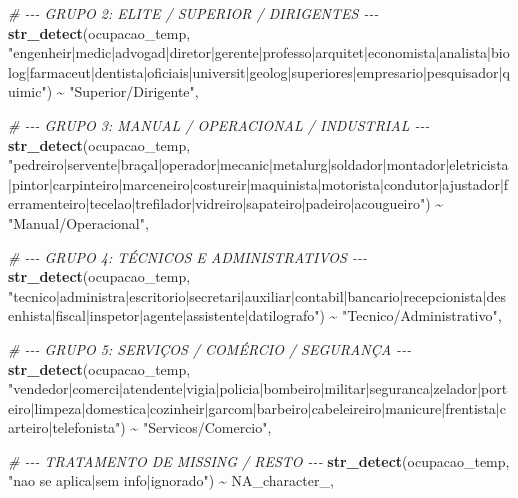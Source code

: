 \documentclass[
]{article}
\newenvironment{Shaded}{\begin{snugshade}}{\end{snugshade}}
\newcommand{\CommentTok}[1]{\textcolor[rgb]{0.56,0.35,0.01}{\textit{#1}}}
\newcommand{\ConstantTok}[1]{\textcolor[rgb]{0.56,0.35,0.01}{#1}}
\newcommand{\FunctionTok}[1]{\textcolor[rgb]{0.13,0.29,0.53}{\textbf{#1}}}
\newcommand{\NormalTok}[1]{#1}
\newcommand{\SpecialCharTok}[1]{\textcolor[rgb]{0.81,0.36,0.00}{\textbf{#1}}}
\newcommand{\StringTok}[1]{\textcolor[rgb]{0.31,0.60,0.02}{#1}}
\begin{document}
\begin{Shaded}
\begin{Highlighting}[]
      \CommentTok{\# {-}{-}{-} GRUPO 2: ELITE / SUPERIOR / DIRIGENTES {-}{-}{-}}
      \FunctionTok{str\_detect}\NormalTok{(ocupacao\_temp, }\StringTok{"engenheir|medic|advogad|diretor|gerente|professo|arquitet|economista|analista|biolog|farmaceut|dentista|oficiais|universit|geolog|superiores|empresario|pesquisador|quimic"}\NormalTok{) }\SpecialCharTok{\textasciitilde{}} \StringTok{"Superior/Dirigente"}\NormalTok{,}
      
      \CommentTok{\# {-}{-}{-} GRUPO 3: MANUAL / OPERACIONAL / INDUSTRIAL {-}{-}{-}}
      \FunctionTok{str\_detect}\NormalTok{(ocupacao\_temp, }\StringTok{"pedreiro|servente|braçal|operador|mecanic|metalurg|soldador|montador|eletricista|pintor|carpinteiro|marceneiro|costureir|maquinista|motorista|condutor|ajustador|ferramenteiro|tecelao|trefilador|vidreiro|sapateiro|padeiro|acougueiro"}\NormalTok{) }\SpecialCharTok{\textasciitilde{}} \StringTok{"Manual/Operacional"}\NormalTok{,}
      
      \CommentTok{\# {-}{-}{-} GRUPO 4: TÉCNICOS E ADMINISTRATIVOS {-}{-}{-}}
      \FunctionTok{str\_detect}\NormalTok{(ocupacao\_temp, }\StringTok{"tecnico|administra|escritorio|secretari|auxiliar|contabil|bancario|recepcionista|desenhista|fiscal|inspetor|agente|assistente|datilografo"}\NormalTok{) }\SpecialCharTok{\textasciitilde{}} \StringTok{"Tecnico/Administrativo"}\NormalTok{,}
      
      \CommentTok{\# {-}{-}{-} GRUPO 5: SERVIÇOS / COMÉRCIO / SEGURANÇA {-}{-}{-}}
      \FunctionTok{str\_detect}\NormalTok{(ocupacao\_temp, }\StringTok{"vendedor|comerci|atendente|vigia|policia|bombeiro|militar|seguranca|zelador|porteiro|limpeza|domestica|cozinheir|garcom|barbeiro|cabeleireiro|manicure|frentista|carteiro|telefonista"}\NormalTok{) }\SpecialCharTok{\textasciitilde{}} \StringTok{"Servicos/Comercio"}\NormalTok{,}
      
      \CommentTok{\# {-}{-}{-} TRATAMENTO DE MISSING / RESTO {-}{-}{-}}
      \FunctionTok{str\_detect}\NormalTok{(ocupacao\_temp, }\StringTok{"nao se aplica|sem info|ignorado"}\NormalTok{) }\SpecialCharTok{\textasciitilde{}} \ConstantTok{NA\_character\_}\NormalTok{,}
      

\end{Highlighting}
\end{Shaded}
\end{document}
